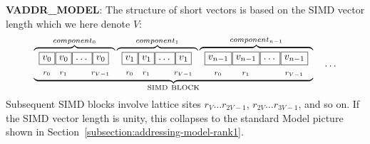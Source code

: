 \textbf{VADDR\_MODEL}: The structure of short vectors is based on the
SIMD vector length which we here denote $V$:
\[
\underbrace{
\overbrace{
\begin{array}{cc} \boxed{v_0} \\  _{r_0} \end{array} \mkern-17mu
\begin{array}{cc} \boxed{v_0} \\  _{r_1} \end{array} \mkern-17mu
\begin{array}{cc} \boxed{\ldots\vphantom{v_0}} \\ \phantom{r_2}\end{array} \mkern-20mu
\begin{array}{cc} \boxed{v_0} \\  _{r_{V-1}} \end{array}
}^{component_0}
\overbrace{
\begin{array}{cc} \boxed{v_1} \\  _{r_0} \end{array} \mkern-17mu
\begin{array}{cc} \boxed{v_1} \\  _{r_1} \end{array} \mkern-17mu
\begin{array}{cc} \boxed{\ldots\vphantom{v_0}} \\ \phantom{r_2}\end{array} \mkern-20mu
\begin{array}{cc} \boxed{v_1} \\  _{r_{V-1}} \end{array}
}^{component_1}
\overbrace{
\begin{array}{cc} \boxed{v_{n-1}} \\  _{r_0} \end{array} \mkern-17mu
\begin{array}{cc} \boxed{v_{n-1}} \\  _{r_1} \end{array} \mkern-17mu
\begin{array}{cc} \boxed{\ldots\vphantom{v_{n-1}}} \\ \phantom{r_2}\end{array}
\mkern-17mu
\begin{array}{cc} \boxed{v_{n-1}} \\  _{r_{V-1}} \end{array}
}^{component_{n-1}}}_{\mathrm{SIMD\ BLOCK}}
\quad\ldots
\]
Subsequent SIMD blocks involve lattice sites $r_V \ldots r_{2V-1}$,
$r_{2V} \ldots r_{3V-1}$, and so on. If the SIMD vector length is unity,
this collapses to the standard Model picture shown in
Section~\ref{subsection:addressing-model-rank1}.

